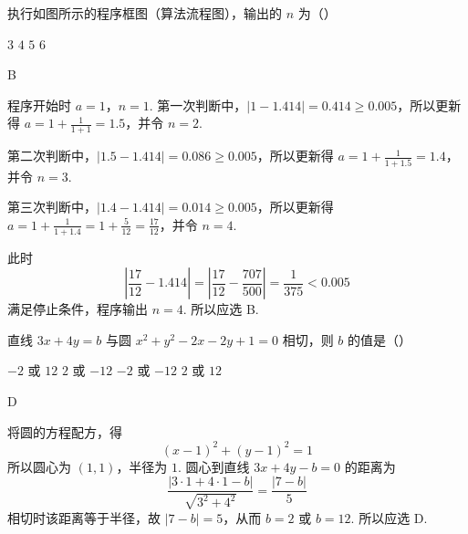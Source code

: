 \begin{problem}
执行如图所示的程序框图（算法流程图），输出的 \(n\) 为（\quad）


\choices
    {\(3\)}
    {\(4\)}
    {\(5\)}
    {\(6\)}

\begin{answer}
B
\end{answer}

\begin{solution}
程序开始时 \(a=1\)，\(n=1\). 第一次判断中，\(|1-1.414|=0.414\geqslant0.005\)，所以更新得 \(a=1+\frac{1}{1+1}=1.5\)，并令 \(n=2\).

第二次判断中，\(|1.5-1.414|=0.086\geqslant0.005\)，所以更新得 \(a=1+\frac{1}{1+1.5}=1.4\)，并令 \(n=3\).

第三次判断中，\(|1.4-1.414|=0.014\geqslant0.005\)，所以更新得 \(a=1+\frac{1}{1+1.4}=1+\frac{5}{12}=\frac{17}{12}\)，并令 \(n=4\).

此时
\[
\left|\frac{17}{12}-1.414\right|=\left|\frac{17}{12}-\frac{707}{500}\right|=\frac{1}{375}<0.005
\]
满足停止条件，程序输出 \(n=4\). 所以应选 B.
\end{solution}
\end{problem}

\begin{problem}
直线 \(3x + 4y = b\) 与圆 \(x^{2} + y^{2} - 2x - 2y + 1 = 0\) 相切，则 \(b\) 的值是（\quad）

\choices
    {\(-2\) 或 \(12\)}
    {\(2\) 或 \(-12\)}
    {\(-2\) 或 \(-12\)}
    {\(2\) 或 \(12\)}

\begin{answer}
D
\end{answer}

\begin{solution}
将圆的方程配方，得
\[
(x-1)^2+(y-1)^2=1
\]
所以圆心为 \((1,1)\)，半径为 \(1\). 圆心到直线 \(3x+4y-b=0\) 的距离为
\[
\frac{|3\cdot1+4\cdot1-b|}{\sqrt{3^2+4^2}}=\frac{|7-b|}{5}
\]
相切时该距离等于半径，故 \(|7-b|=5\)，从而 \(b=2\) 或 \(b=12\). 所以应选 D.
\end{solution}
\end{problem}

